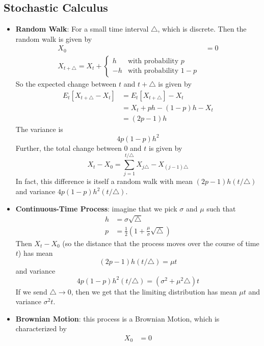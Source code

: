 \documentclass[12pt]{article}
\begin{document}
\subsection{Stochastic Calculus}

\begin{itemize}
    \item \textbf{Random Walk}: For a small time interval $\triangle$, which is discrete. Then the random walk is given by
    \[\begin{split}
        X_0 &= 0 \\
        X_{t+\triangle} = X_t + \begin{cases}
        h & \text{with probability $p$} \\
        -h & \text{with probability $1-p$}
        \end{cases}
    \end{split}\]
    So the expected change between $t$ and $t+\triangle$ is given by
    \[\begin{split}
        E_t[X_{t+\triangle} - X_t] &= E_t[X_{t+\triangle}] - X_t \\
        &= X_t + ph - (1-p)h - X_t \\
        &= (2p-1)h
    \end{split}\]
    The variance is
    \[4p(1-p)h^2\]
    Further, the total change between 0 and $t$ is given by
    \[X_t - X_0 = \sum_{j=1}^{t/\triangle}X_{j\triangle} - X_{(j-1)\triangle}\]
    In fact, this difference is itself a random walk with mean $(2p-1)h(t/\triangle)$ and variance $4p(1-p)h^2(t/\triangle)$.
    \item \textbf{Continuous-Time Process}: imagine that we pick $\sigma$ and $\mu$ such that 
    \[\begin{split}
        h &= \sigma \sqrt{\triangle} \\
        p &= \frac{1}{2}\left(1 + \frac{\mu}{\sigma}\sqrt{\triangle}\right)
    \end{split}\]
    Then $X_t - X_0$ (so the distance that the process moves over the course of time $t$) has mean
    \[(2p-1)h(t/\triangle) = \mu t\]
    and variance
    \[4p(1-p)h^2(t/\triangle) = (\sigma^2 + \mu^2\triangle)t\]
    If we send $\triangle \to 0$, then we get that the limiting distribution has mean $\mu t$ and variance $\sigma^2 t$. 
    \item \textbf{Brownian Motion}: this process is a Brownian Motion, which is characterized by
    \[\begin{split}
        X_0 &= 0 \\

\end{split}\]
\end{itemize}
\end{document}
